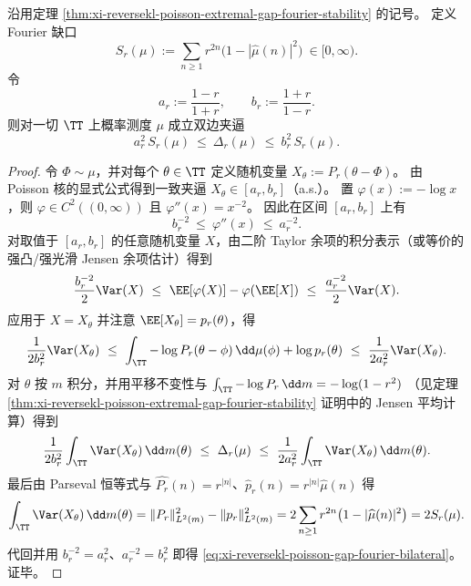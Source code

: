 \begin{theorem}\label{thm:xi-reversekl-poisson-gap-fourier-bilateral}
沿用定理 \ref{thm:xi-reversekl-poisson-extremal-gap-fourier-stability} 的记号。
定义 Fourier 缺口
\[
S_r(\mu):=\sum_{n\ge 1} r^{2n}\bigl(1-|\widehat\mu(n)|^2\bigr)\ \in[0,\infty).
\]
令
\[
a_r:=\frac{1-r}{1+r},\qquad b_r:=\frac{1+r}{1-r}.
\]
则对一切 \(\TT\) 上概率测度 \(\mu\) 成立双边夹逼
\begin{equation}\label{eq:xi-reversekl-poisson-gap-fourier-bilateral}
\boxed{\;
a_r^{2}\,S_r(\mu)\ \le\ \Delta_r(\mu)\ \le\ b_r^{2}\,S_r(\mu).\;}
\end{equation}
\end{theorem}
\begin{proof}
令 \(\Phi\sim\mu\)，并对每个 \(\theta\in\TT\) 定义随机变量
\(
X_\theta:=P_r(\theta-\Phi)
\)。
由 Poisson 核的显式公式得到一致夹逼 \(X_\theta\in[a_r,b_r]\)（a.s.）。
置 \(\varphi(x):=-\log x\)，则 \(\varphi\in C^2((0,\infty))\) 且 \(\varphi''(x)=x^{-2}\)。
因此在区间 \([a_r,b_r]\) 上有
\[
b_r^{-2}\ \le\ \varphi''(x)\ \le\ a_r^{-2}.
\]
对取值于 \([a_r,b_r]\) 的任意随机变量 \(X\)，由二阶 Taylor 余项的积分表示（或等价的强凸/强光滑 Jensen 余项估计）得到
\[
\frac{b_r^{-2}}{2}\Var(X)
\ \le\
\EE[\varphi(X)]-\varphi(\EE[X])
\ \le\
\frac{a_r^{-2}}{2}\Var(X).
\]
应用于 \(X=X_\theta\) 并注意 \(\EE[X_\theta]=p_r(\theta)\)，得
\[
\frac{1}{2b_r^{2}}\Var(X_\theta)
\ \le\
\int_{\TT}-\log P_r(\theta-\phi)\,\dd\mu(\phi)+\log p_r(\theta)
\ \le\
\frac{1}{2a_r^{2}}\Var(X_\theta).
\]
对 \(\theta\) 按 \(m\) 积分，并用平移不变性与
\(
\int_{\TT}-\log P_r\,\dd m=-\log(1-r^2)
\)
（见定理 \ref{thm:xi-reversekl-poisson-extremal-gap-fourier-stability} 证明中的 Jensen 平均计算）得到
\[
\frac{1}{2b_r^2}\int_{\TT}\Var(X_\theta)\,\dd m(\theta)
\ \le\ \Delta_r(\mu)\ \le\
\frac{1}{2a_r^2}\int_{\TT}\Var(X_\theta)\,\dd m(\theta).
\]
最后由 Parseval 恒等式与 \(\widehat{P_r}(n)=r^{|n|}\)、\(\widehat p_r(n)=r^{|n|}\widehat\mu(n)\) 得
\[
\int_{\TT}\Var(X_\theta)\,\dd m(\theta)
=\|P_r\|_{L^2(m)}^2-\|p_r\|_{L^2(m)}^2
=2\sum_{n\ge 1}r^{2n}\bigl(1-|\widehat\mu(n)|^2\bigr)
=2S_r(\mu).
\]
代回并用 \(b_r^{-2}=a_r^2\)、\(a_r^{-2}=b_r^2\) 即得 \eqref{eq:xi-reversekl-poisson-gap-fourier-bilateral}。证毕。
\end{proof}

